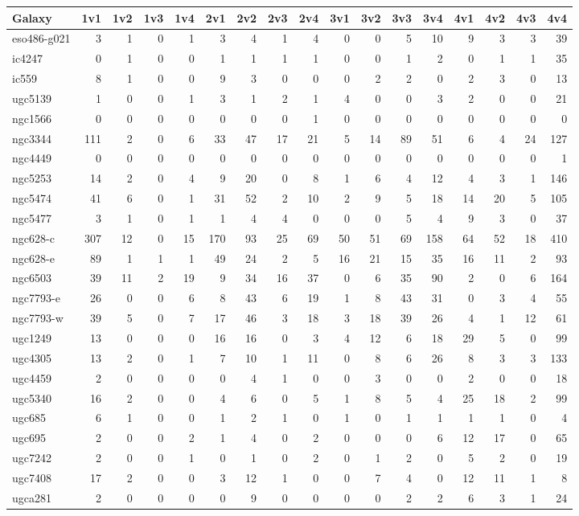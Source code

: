 \begin{tabular}{lrrrrrrrrrrrrrrrr}
\toprule
Galaxy & 1v1 & 1v2 & 1v3 & 1v4 & 2v1 & 2v2 & 2v3 & 2v4 & 3v1 & 3v2 & 3v3 & 3v4 & 4v1 & 4v2 & 4v3 & 4v4 \\
\midrule
eso486-g021 & 3 & 1 & 0 & 1 & 3 & 4 & 1 & 4 & 0 & 0 & 5 & 10 & 9 & 3 & 3 & 39 \\
ic4247 & 0 & 1 & 0 & 0 & 1 & 1 & 1 & 1 & 0 & 0 & 1 & 2 & 0 & 1 & 1 & 35 \\
ic559 & 8 & 1 & 0 & 0 & 9 & 3 & 0 & 0 & 0 & 2 & 2 & 0 & 2 & 3 & 0 & 13 \\
ugc5139 & 1 & 0 & 0 & 1 & 3 & 1 & 2 & 1 & 4 & 0 & 0 & 3 & 2 & 0 & 0 & 21 \\
ngc1566 & 0 & 0 & 0 & 0 & 0 & 0 & 0 & 1 & 0 & 0 & 0 & 0 & 0 & 0 & 0 & 0 \\
ngc3344 & 111 & 2 & 0 & 6 & 33 & 47 & 17 & 21 & 5 & 14 & 89 & 51 & 6 & 4 & 24 & 127 \\
ngc4449 & 0 & 0 & 0 & 0 & 0 & 0 & 0 & 0 & 0 & 0 & 0 & 0 & 0 & 0 & 0 & 1 \\
ngc5253 & 14 & 2 & 0 & 4 & 9 & 20 & 0 & 8 & 1 & 6 & 4 & 12 & 4 & 3 & 1 & 146 \\
ngc5474 & 41 & 6 & 0 & 1 & 31 & 52 & 2 & 10 & 2 & 9 & 5 & 18 & 14 & 20 & 5 & 105 \\
ngc5477 & 3 & 1 & 0 & 1 & 1 & 4 & 4 & 0 & 0 & 0 & 5 & 4 & 9 & 3 & 0 & 37 \\
ngc628-c & 307 & 12 & 0 & 15 & 170 & 93 & 25 & 69 & 50 & 51 & 69 & 158 & 64 & 52 & 18 & 410 \\
ngc628-e & 89 & 1 & 1 & 1 & 49 & 24 & 2 & 5 & 16 & 21 & 15 & 35 & 16 & 11 & 2 & 93 \\
ngc6503 & 39 & 11 & 2 & 19 & 9 & 34 & 16 & 37 & 0 & 6 & 35 & 90 & 2 & 0 & 6 & 164 \\
ngc7793-e & 26 & 0 & 0 & 6 & 8 & 43 & 6 & 19 & 1 & 8 & 43 & 31 & 0 & 3 & 4 & 55 \\
ngc7793-w & 39 & 5 & 0 & 7 & 17 & 46 & 3 & 18 & 3 & 18 & 39 & 26 & 4 & 1 & 12 & 61 \\
ugc1249 & 13 & 0 & 0 & 0 & 16 & 16 & 0 & 3 & 4 & 12 & 6 & 18 & 29 & 5 & 0 & 99 \\
ugc4305 & 13 & 2 & 0 & 1 & 7 & 10 & 1 & 11 & 0 & 8 & 6 & 26 & 8 & 3 & 3 & 133 \\
ugc4459 & 2 & 0 & 0 & 0 & 0 & 4 & 1 & 0 & 0 & 3 & 0 & 0 & 2 & 0 & 0 & 18 \\
ugc5340 & 16 & 2 & 0 & 0 & 4 & 6 & 0 & 5 & 1 & 8 & 5 & 4 & 25 & 18 & 2 & 99 \\
ugc685 & 6 & 1 & 0 & 0 & 1 & 2 & 1 & 0 & 1 & 0 & 1 & 1 & 1 & 1 & 0 & 4 \\
ugc695 & 2 & 0 & 0 & 2 & 1 & 4 & 0 & 2 & 0 & 0 & 0 & 6 & 12 & 17 & 0 & 65 \\
ugc7242 & 2 & 0 & 0 & 1 & 0 & 1 & 0 & 2 & 0 & 1 & 2 & 0 & 5 & 2 & 0 & 19 \\
ugc7408 & 17 & 2 & 0 & 0 & 3 & 12 & 1 & 0 & 0 & 7 & 4 & 0 & 12 & 11 & 1 & 8 \\
ugca281 & 2 & 0 & 0 & 0 & 0 & 9 & 0 & 0 & 0 & 0 & 2 & 2 & 6 & 3 & 1 & 24 \\
\bottomrule
\end{tabular}
